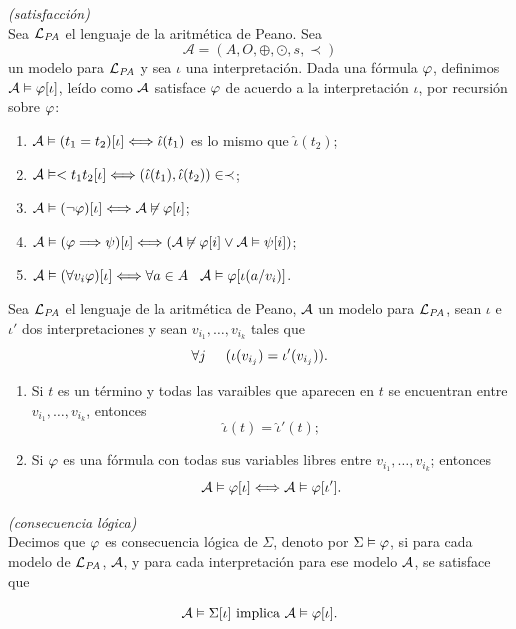 \begin{defn} \textit{(satisfacción)}\\
    Sea $\mathcal{L}_{\textit{PA}}$ el lenguaje de la aritmética de Peano. Sea
    \[\mathcal{A}=(A,O,\oplus,\odot,s,\prec)\]
    un modelo para $\mathcal{L}_{\textit{PA}}$ y sea $\iota$ una interpretación.
    Dada una fórmula $\varphi$, definimos $\mathcal{A}\vDash\varphi[\iota]$, leído como $\mathcal{A}$ satisface $\varphi$ de acuerdo a la interpretación $\iota$, por recursión sobre $\varphi$:
    \begin{enumerate}
        \item $\mathcal{A}\vDash(t_1=t_2)[\iota]\Longleftrightarrow\hat{\iota}(t_1)$ es lo mismo que $\hat{\iota}(t_2)$;
        \item $\mathcal{A}\vDash<{t_1}{t_2}[\iota]\Longleftrightarrow(\hat{\iota}(t_1),\hat{\iota}(t_2))\in\prec$;
        \item $\mathcal{A}\vDash(\neg\varphi)[\iota]\Longleftrightarrow\mathcal{A}\not\vDash\varphi[\iota]$;
        \item $\mathcal{A}\vDash(\varphi\Longrightarrow\psi)[\iota]\Longleftrightarrow(\mathcal{A}\not\vDash\varphi[i]\lor \mathcal{A}\vDash\psi[i])$;
        \item $\mathcal{A}\vDash(\forall v_i\varphi)[\iota]\Longleftrightarrow\forall a\in A\hspace{0.3cm}\mathcal{A}\vDash\varphi[\iota(a/v_i)]$.
    \end{enumerate}
\end{defn}
\begin{lem}
    Sea $\mathcal{L}_{\textit{PA}}$ el lenguaje de la aritmética de Peano, $\mathcal{A}$ un modelo para $\mathcal{L}_{\textit{PA}}$, sean $\iota$ e $\iota'$ dos interpretaciones y sean $v_{i_1},\ldots,v_{i_k}$ tales que
    \[\forall j\hspace{0.5cm}(\iota(v_{i_j})=\iota'(v_{i_j})).\]
    \begin{enumerate}
        \item Si $t$ es un término y todas las varaibles que aparecen en $t$ se encuentran entre $v_{i_1},\ldots,v_{i_k}$, entonces
            \[\hat{\iota}(t)=\hat{\iota}'(t);\]
        \item Si $\varphi$ es una fórmula con todas sus variables libres entre $v_{i_1},\ldots,v_{i_k}$; entonces
            \[\mathcal{A}\vDash\varphi[\iota]\Longleftrightarrow\mathcal{A}\vDash\varphi[\iota'].\]
    \end{enumerate}
\end{lem}
\begin{defn} \textit{(consecuencia lógica)}\\
    Decimos que $\varphi$ es consecuencia lógica de $\Sigma$, denoto por $\Sigma\vDash \varphi$, si para cada modelo de $\mathcal{L}_{\textit{PA}}$, $\mathcal{A}$, y para cada interpretación para ese modelo $\mathcal{A}$, se satisface que

    \[\mathcal{A}\vDash\Sigma[\iota]\text{ implica }\mathcal{A}\vDash\varphi[\iota].\]
\end{defn}
